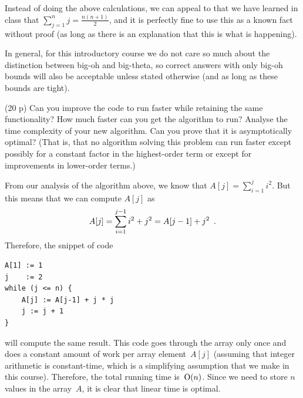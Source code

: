 \documentclass{jn-pset}
\begin{document}
\begin{problem}
\begin{solution}
  Instead of doing the above calculations, we can appeal to that we have
  learned in class that
  $
  \sum_{j=1}^{n} j = \frac{n(n+1)}{2}
  $,
  and it is perfectly fine to use this as a known fact without proof
  (as long as there is an explanation that this is what is happening).

  In general, for this introductory course we do not care so much
  about the distinction between big-oh and big-theta, so correct
  answers with only big-oh bounds will also be acceptable unless
  stated otherwise (and as long as these bounds are tight).
\end{solution}


\begin{subproblem}%
  {(20 p)}
  {\ignorespaces}
  Can you improve the code to run faster while retaining the same
  functionality?
  How much faster can you get the algorithm to run?
  Analyse the time complexity of your new algorithm.
  Can you prove that it is asymptotically optimal?
  (That is, that no algorithm solving this problem can run faster
  except possibly for a constant factor in the highest-order term or
  except for improvements in lower-order terms.)
\end{subproblem}

\begin{solution}
  From our analysis of the algorithm above,
  we know that
  $
  A[j] =
  \sum_{i=1}^{j} i^2  
  $.
  But this means that we can compute
  $A[j]$ as
  \begin{equation}
    \label{eq:square-sum}
  A[j]
  =
  \sum_{i=1}^{j-1} i^2  + j^2
  =
  A[j-1] + j^2
  \enspace .    
  \end{equation}
  Therefore, the snippet of code
\begin{verbatim}
A[1] := 1
j    := 2
while (j <= n) {
    A[j] := A[j-1] + j * j
    j := j + 1
}
\end{verbatim}
  will compute the same result.
  This code goes through the array only once
  and does a constant amount of work per
  array element~$A[j]$
  (assuming that integer arithmetic is constant-time,
  which is a simplifying assumption that we make in this course).
  Therefore, the total running time is~$\mathrm{O} ( n )$.
  Since we need to store $n$ values in the array~$A$,
  it is clear that linear time is optimal. 
\end{solution}

\end{problem}
\end{document}
